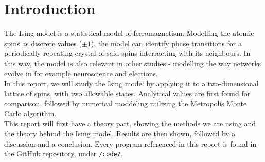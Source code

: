 \documentclass[../main.tex]{subfiles}
\begin{document}
\section{Introduction}
The Ising model is a statistical model of ferromagnetism. Modelling the atomic spins as discrete values ($\pm 1$), the model can identify phase transitions for a periodically repeating crystal of said spins interracting with its neighbours. In this way, the model is also relevant in other studies - modelling the way networks evolve in for example neuroscience and elections. \\
In this report, we will study the Ising model by applying it to a two-dimensional lattice of spins, with two allowable states. Analytical values are first found for comparison, followed by numerical moddeling utilizing the Metropolis Monte Carlo algorithm. \\
This report will first have a theory part, showing the methods we are using and the theory behind the Ising model. Results are then shown, followed by a discussion and a conclusion. Every program referenced in this report is found in the \href{https://github.com/kmaasrud/Project-4}{GitHub repository}, under \verb+/code/+.
\end{document}
